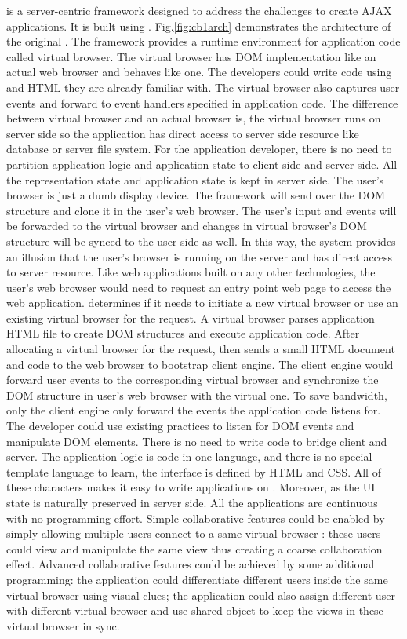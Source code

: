\cb{} is a server-centric framework designed to address the challenges to create AJAX applications.
It is built using \nodejs{}.
Fig.\ref{fig:cb1arch} demonstrates the architecture of the original \cb{}.%
The framework provides a runtime environment for application code called virtual browser.
The virtual browser has DOM implementation like an actual web browser and behaves like one.
The developers could write code using \js{} and HTML they are already familiar with.
The virtual browser also captures user events and forward to event handlers specified in application
\js{} code.
The difference between virtual browser and an actual browser is, 
the virtual browser runs on server side so the application \js{} has
direct access to server side resource like database or server file system.
For the application developer, 
there is no need to partition application logic and application state to client side and server side.
All the representation state and application state is kept in server side.
The user's browser is just a dumb display device.%
The framework will send over the DOM structure and clone it in the 
user's web browser.
The user's input and events will be forwarded to the virtual browser and
changes in virtual browser's DOM structure will be synced to the user side as well.
In this way, the system provides an illusion that the user's browser is running on the 
server and has direct access to server resource.
Like web applications built on any other technologies, 
the user's web browser would need to request an entry point web page to access the web application.
\cb{} determines if it needs to initiate a new virtual browser or use an existing
virtual browser for the request.
A virtual browser parses application HTML file to create DOM structures and
execute application \js{} code.
After allocating a virtual browser for the request,
\cb{} then sends a small HTML document and \js{} code to the web browser to
bootstrap client engine.
The client engine would forward user events to the corresponding virtual browser and
synchronize the DOM structure in user's web browser with the virtual one.
To save bandwidth, only the client engine only forward the events the application code listens for.
The developer could use existing practices to listen for DOM events and manipulate DOM elements.
There is no need to write code to bridge client and server.
The application logic is code in one language, 
and there is no special template language to learn, 
the interface is defined by HTML and CSS.
All of these characters makes it easy to write applications on \cb{}.
Moreover,
as the UI state is naturally preserved in server side.
All the applications are continuous with no programming effort.
Simple collaborative features could be enabled by simply allowing multiple users
connect to a same virtual browser :
these users could view and manipulate the same view thus creating a coarse
collaboration effect.
Advanced collaborative features could be achieved by some additional
programming:
the application could differentiate different users inside the same virtual browser 
using visual clues; 
the application could also assign different user with different virtual browser and use
shared object to keep the views in these virtual browser in sync.

